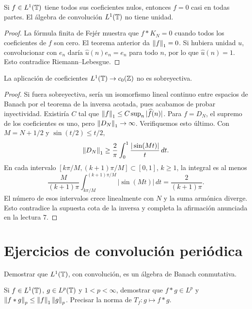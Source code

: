 \begin{corolario}\label{v4:unicidad-T}
Si $f\in L^1(\mathbb T)$ tiene todos sus coeficientes nulos, entonces $f=0$ casi en todas partes. El álgebra de convolución $L^1(\mathbb T)$ no tiene unidad.
\end{corolario}
\begin{proof}
La fórmula finita de Fejér muestra que $f*K_N=0$ cuando todos los coeficientes de $f$ son cero. El teorema anterior da $\left\lVert f\right\rVert_1=0$. Si hubiera unidad $u$, convolucionar con $e_n$ daría $\widehat u(n)e_n=e_n$ para todo $n$, por lo que $\widehat u(n)=1$. Esto contradice Riemann--Lebesgue.
\end{proof}
\begin{proposicion}
La aplicación de coeficientes $L^1(\mathbb T)\to c_0(\mathbb Z)$ no es sobreyectiva.
\end{proposicion}
\begin{proof}
Si fuera sobreyectiva, sería un isomorfismo lineal continuo entre espacios de Banach por el teorema de la inversa acotada, pues acabamos de probar inyectividad. Existiría $C$ tal que $\left\lVert f\right\rVert_1\leq C\sup_n|\widehat f(n)|$. Para $f=D_N$, el supremo de los coeficientes es uno, pero $\left\lVert D_N\right\rVert_1\to\infty$. Verifiquemos esto último. Con $M=N+1/2$ y $\sin(t/2)\leq t/2$,
\[
 \left\lVert D_N\right\rVert_1\geq\frac2\pi\int_0^1\frac{|\sin(Mt)|}{t}\,dt.
\]
En cada intervalo $[k\pi/M,(k+1)\pi/M]\subset[0,1]$, $k\geq1$, la integral es al menos
\[
 \frac{M}{(k+1)\pi}\int_{k\pi/M}^{(k+1)\pi/M}|\sin(Mt)|\,dt
 =\frac2{(k+1)\pi}.
\]
El número de esos intervalos crece linealmente con $N$ y la suma armónica diverge. Esto contradice la supuesta cota de la inversa y completa la afirmación anunciada en la lectura 7.
\end{proof}

\section{Ejercicios de convolución periódica}
\begin{ejercicio}\label{ej:v4-l08-1}
Demostrar que $L^1(\mathbb T)$, con convolución, es un álgebra de Banach conmutativa.
\end{ejercicio}

\begin{ejercicio}\label{ej:v4-l08-2}
Si $f\in L^1(\mathbb T)$, $g\in L^p(\mathbb T)$ y $1<p<\infty$, demostrar que $f*g\in L^p$ y $\left\lVert f*g\right\rVert_p\leq\left\lVert f\right\rVert_1\left\lVert g\right\rVert_p$. Precisar la norma de $T_f:g\mapsto f*g$.
\end{ejercicio}

